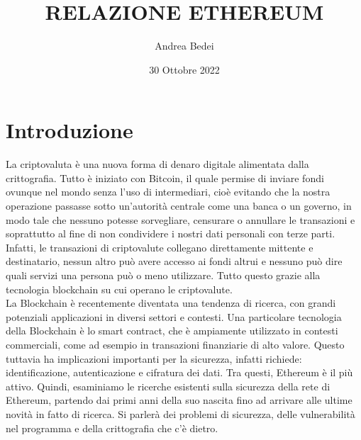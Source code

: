\documentclass[a4paper,11pt]{report}
\title{\Huge RELAZIONE ETHEREUM}
\author{Andrea Bedei}
\date{30 Ottobre 2022}
\begin{document}
\maketitle
\tableofcontents
\listoffigures

\chapter{Introduzione}
La criptovaluta è una nuova forma di denaro digitale alimentata dalla crittografia. Tutto è iniziato con Bitcoin, il quale permise di inviare fondi ovunque nel mondo senza l'uso di intermediari, cioè evitando che la nostra operazione passasse sotto un'autorità centrale come una banca o un governo, in modo tale che nessuno potesse sorvegliare, censurare o annullare le transazioni e soprattutto al fine di non condividere i nostri dati personali con terze parti.
Infatti, le transazioni di criptovalute collegano direttamente mittente e destinatario, nessun altro può avere accesso ai fondi altrui e nessuno può dire quali servizi una persona può o meno utilizzare. Tutto questo grazie alla tecnologia blockchain su cui operano le criptovalute.\\
La Blockchain è recentemente diventata una tendenza di ricerca, con grandi potenziali applicazioni in diversi settori e contesti. Una particolare tecnologia della Blockchain è lo smart contract, che è ampiamente utilizzato in contesti commerciali, come ad esempio in transazioni finanziarie di alto valore. Questo tuttavia ha implicazioni importanti per la sicurezza, infatti richiede: identificazione, autenticazione e cifratura dei dati. Tra questi, Ethereum è il più attivo. Quindi, esaminiamo le ricerche esistenti sulla sicurezza della rete di Ethereum, partendo dai primi anni della suo nascita fino ad arrivare alle ultime novità in fatto di ricerca. Si parlerà dei problemi di sicurezza, delle vulnerabilità nel programma e della crittografia che c'è dietro.
\end{document}
